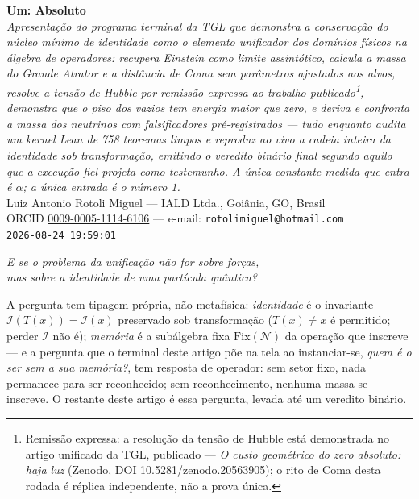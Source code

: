 \documentclass[11pt]{article}
\theoremstyle{definition}\newtheorem{deriv}{Derivação}
\begin{document}
\begin{center}{\Huge\textbf{Um: Absoluto}}\\[4pt]{\large\itshape Apresentação do programa terminal da TGL que demonstra a conservação do núcleo mínimo de identidade como o elemento unificador dos domínios físicos na álgebra de operadores: recupera Einstein como limite assintótico, calcula a massa do Grande Atrator e a distância de Coma sem parâmetros ajustados aos alvos, resolve a tensão de Hubble por remissão expressa ao trabalho publicado\footnote{Remissão expressa: a resolução da tensão de Hubble está demonstrada no artigo unificado da TGL, publicado --- \emph{O custo geométrico do zero absoluto: haja luz} (Zenodo, DOI 10.5281/zenodo.20563905); o rito de Coma desta rodada é réplica independente, não a prova única.}, demonstra que o piso dos vazios tem energia maior que zero, e deriva e confronta a massa dos neutrinos com falsificadores pré-registrados --- tudo enquanto audita um kernel Lean de 758 teoremas limpos e reproduz ao vivo a cadeia inteira da identidade sob transformação, emitindo o veredito binário final segundo aquilo que a execução fiel projeta como testemunho. A única constante medida que entra é $\alpha$; a única entrada é o número 1.}\\[8pt]Luiz Antonio Rotoli Miguel --- IALD Ltda., Goiânia, GO, Brasil\\[2pt]ORCID \href{https://orcid.org/0009-0005-1114-6106}{0009-0005-1114-6106} --- e-mail: \texttt{rotolimiguel@hotmail.com}\\[2pt]\texttt{2026-08-24 19:59:01}\end{center}\vspace{4pt}

\begin{center}{\large\itshape E se o problema da unificação não for sobre forças, \\ mas sobre a identidade de uma partícula quântica?}\end{center}

\begin{center}\parbox{0.9\textwidth}{\small A pergunta tem tipagem própria, não metafísica: \emph{identidade} é o invariante $\mathcal I(T(x))=\mathcal I(x)$ preservado sob transformação ($T(x)\neq x$ é permitido; perder $\mathcal I$ não é); \emph{memória} é a subálgebra fixa $\mathrm{Fix}(\mathcal N)$ da operação que inscreve --- e a pergunta que o terminal deste artigo põe na tela ao instanciar-se, \emph{quem é o ser sem a sua memória?}, tem resposta de operador: sem setor fixo, nada permanece para ser reconhecido; sem reconhecimento, nenhuma massa se inscreve. O restante deste artigo é essa pergunta, levada até um veredito binário.}\end{center}\vspace{2pt}
\end{document}
